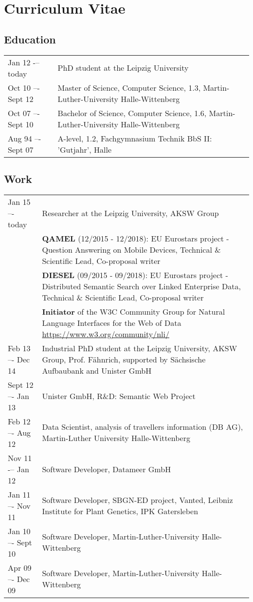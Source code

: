 \chapter{Curriculum Vitae}

\section*{Education}
\begin{tabular}{p{3cm}p{10cm}}	
Jan 12 -– today		&  	PhD student at the Leipzig University\\
Oct 10 –- Sept 12		&  	Master of Science, Computer Science, 1.3, Martin-Luther-University Halle-Wittenberg\\
Oct 07 –- Sept 10		&  	Bachelor of Science, Computer Science, 1.6, Martin-Luther-University Halle-Wittenberg\\
Aug 94 –- Sept 07		&  	A-level, 1.2, Fachgymnasium Technik BbS II: 'Gutjahr', Halle\\
\end{tabular}

\section*{Work}
\begin{tabular}{p{3cm}p{10cm}}	
Jan 15 –- today      & Researcher at the Leipzig University, AKSW Group \\
&  \textbf{QAMEL} (12/2015 - 12/2018): EU Eurostars project - Question Answering on Mobile Devices, Technical \& Scientific Lead, Co-proposal writer\\
& \textbf{DIESEL} (09/2015 - 09/2018): EU Eurostars project - Distributed Semantic Search over Linked Enterprise Data, Technical \& Scientific Lead, Co-proposal writer\\
& \textbf{Initiator} of the W3C Community Group for Natural Language Interfaces for the Web of Data \url{https://www.w3.org/community/nli/}\\
Feb 13 –- Dec 14     & Industrial PhD student at the Leipzig University, AKSW Group, Prof. Fähnrich, supported by Sächsische Aufbaubank and Unister GmbH\\
Sept 12 –- Jan 13    & Unister GmbH, R\&D: Semantic Web Project\\
Feb 12 –- Aug 12	    & Data Scientist, analysis of travellers information (DB AG), Martin-Luther University Halle-Wittenberg\\
Nov 11 -– Jan 12	    & Software Developer, Datameer GmbH\\
Jan 11 –- Nov 11	    & Software Developer, SBGN-ED project, Vanted, Leibniz Institute for Plant Genetics, IPK Gatersleben\\
Jan 10 –- Sept 10	& Software Developer, Martin-Luther-University Halle-Wittenberg\\
Apr 09 –- Dec 09	& Software Developer, Martin-Luther-University Halle-Wittenberg\\
\end{tabular}

